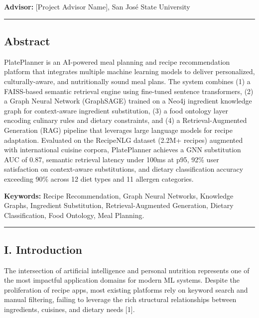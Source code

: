 \documentclass[10pt,conference,compsoc]{IEEEtran}
\begin{document}
\textbf{Advisor:} {[}Project Advisor Name{]}, San José State University

\begin{center}\rule{0.5\linewidth}{0.5pt}\end{center}

\subsection{Abstract}\label{abstract}

PlatePlanner is an AI-powered meal planning and recipe recommendation
platform that integrates multiple machine learning models to deliver
personalized, culturally-aware, and nutritionally sound meal plans. The
system combines (1) a FAISS-based semantic retrieval engine using
fine-tuned sentence transformers, (2) a Graph Neural Network (GraphSAGE)
trained on a Neo4j ingredient knowledge graph for context-aware
ingredient substitution, (3) a food ontology layer encoding culinary
rules and dietary constraints, and (4) a Retrieval-Augmented Generation
(RAG) pipeline that leverages large language models for recipe
adaptation. Evaluated on the RecipeNLG dataset (2.2M+ recipes) augmented
with international cuisine corpora, PlatePlanner achieves a GNN
substitution AUC of 0.87, semantic retrieval latency under 100ms at p95,
92\% user satisfaction on context-aware substitutions, and dietary
classification accuracy exceeding 90\% across 12 diet types and 11
allergen categories.

\textbf{Keywords:} Recipe Recommendation, Graph Neural Networks,
Knowledge Graphs, Ingredient Substitution, Retrieval-Augmented
Generation, Dietary Classification, Food Ontology, Meal Planning.

\begin{center}\rule{0.5\linewidth}{0.5pt}\end{center}

\subsection{I. Introduction}\label{i.-introduction}

The intersection of artificial intelligence and personal nutrition
represents one of the most impactful application domains for modern ML
systems. Despite the proliferation of recipe apps, most existing
platforms rely on keyword search and manual filtering, failing to
leverage the rich structural relationships between ingredients,
cuisines, and dietary needs {[}1{]}.
\end{document}
